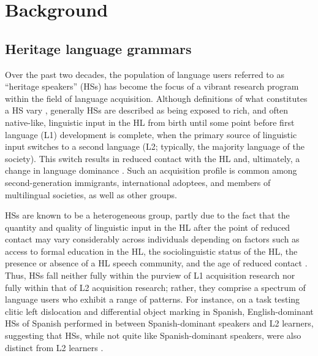 \documentclass[output=paper,colorlinks,citecolor=brown]{langscibook}
\begin{document}
\section{Background}
\label{BackgroundSec}

\subsection{Heritage language grammars}
\label{HSSec}

Over the past two decades, the population of language users referred to as ``heritage speakers'' (HSs) has become the focus of a vibrant research program within the field of language acquisition. Although definitions of what constitutes a HS vary \citep[see][]{Polinsky2006, Montrul2008b, Rothman2009, BenmamounPolinsky2013Heritage, ScontrasFuchsPolinsky2015}, generally HSs are described as being exposed to rich, and often native-like, linguistic input in the HL from birth until some point before first language (L1) development is complete, when the primary source of linguistic input switches to a second language (L2; typically, the majority language of the society). This switch results in reduced contact with the HL and, ultimately, a change in language dominance \citep{Polinsky2008Heritage}. Such an acquisition profile is common among second-generation immigrants, international adoptees, and members of multilingual societies, as well as other groups. 

HSs are known to be a heterogeneous group, partly due to the fact that the quantity and quality of linguistic input in the HL after the point of reduced contact may vary considerably across individuals depending on factors such as access to formal education in the HL, the sociolinguistic status of the HL, the presence or absence of a HL speech community, and the age of reduced contact \citep{Montrul2010Dominant}. Thus, HSs fall neither fully within the purview of L1 acquisition research nor fully within that of L2 acquisition research; rather, they comprise a spectrum of language users who exhibit a range of patterns. For instance, on a task testing clitic left dislocation and differential object marking in Spanish, English-dominant HSs of Spanish performed in between Spanish-dominant speakers and L2 learners, suggesting that HSs, while not quite like Spanish-dominant speakers, were also distinct from L2 learners \citep{Montrul2010Dominant}.
\end{document}
